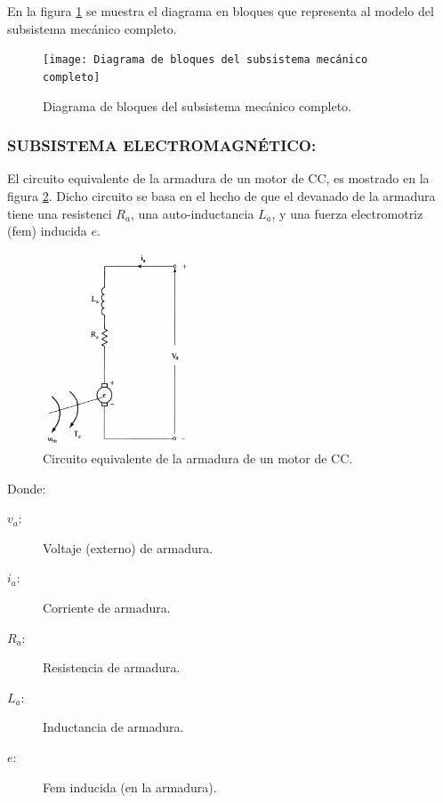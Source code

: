 \documentclass{article}
\begin{document}
\begin{sloppypar}
En la figura \ref{fig:Diagrama de bloques del subsistema mecánico completo} se muestra el diagrama en bloques que representa al modelo del subsistema mecánico completo.

\begin{figure}[H]
    \centering
    \texttt{[image: Diagrama de bloques del subsistema mecánico completo]}
    \caption{Diagrama de bloques del subsistema mecánico completo.}
    \label{fig:Diagrama de bloques del subsistema mecánico completo}
\end{figure}


\subsubsection{SUBSISTEMA ELECTROMAGNÉTICO:}
\label{sec:SUBSISTEMA ELECTROMAGNÉTICO:}

El circuito equivalente de la armadura de un motor de CC, es mostrado en la figura \ref{fig:Circuito equivalente de la armadura de un motor de CC}. Dicho circuito se basa en el hecho de que el devanado de la armadura tiene una resistenci $R_a$, una auto-inductancia $L_a$, y una fuerza electromotriz (fem) inducida $e$.

\begin{figure}[H]
    \centering
    \includegraphics[width=0.4\textwidth]{Circuito equivalente de la armadura de un motor de CC}
    \caption{Circuito equivalente de la armadura de un motor de CC.}
    \label{fig:Circuito equivalente de la armadura de un motor de CC}
\end{figure}

Donde:
\begin{description}
	\item[$v_a:$] Voltaje (externo) de armadura.
    \item[$i_a:$] Corriente de armadura.
    \item[$R_a:$] Resistencia de armadura.
    \item[$L_a:$] Inductancia de armadura.
    \item[$e:$]  Fem inducida (en la armadura).
\end{description}


\end{sloppypar}
\end{document}

